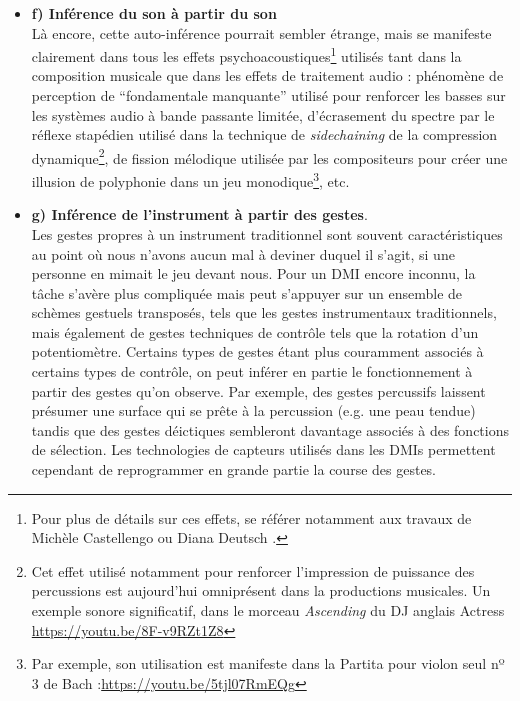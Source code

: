 \begin{itemize}[noitemsep]
	\item \textbf{f) Inférence du son à partir du son}\\
	Là encore, cette auto-inférence pourrait sembler étrange, mais se manifeste clairement dans tous les effets psychoacoustiques\footnote{Pour plus de détails sur ces effets, se référer notamment aux travaux de Michèle Castellengo \cite{castellengo_ecoute_2015} ou Diana Deutsch \cite{deutsch_psychology_2013}.} utilisés tant dans la composition musicale que dans les effets de traitement audio : phénomène de perception de ``fondamentale manquante'' utilisé pour renforcer les basses sur les systèmes audio à bande passante limitée, d'écrasement du spectre par le réflexe stapédien utilisé dans la technique de \textit{sidechaining} de la compression dynamique\footnote{\label{fn:gesture:sidechain} Cet effet utilisé notamment pour renforcer l'impression de puissance des percussions est aujourd'hui omniprésent dans la productions musicales. Un exemple sonore significatif, dans le morceau \textit{Ascending} du \gls{DJ} anglais Actress \url{https://youtu.be/8F-v9RZt1Z8}}, de fission mélodique utilisée par les compositeurs pour créer une illusion de polyphonie dans un jeu monodique\footnote{Par exemple, son utilisation est manifeste dans la Partita pour violon seul nº 3 de Bach :\url{https://youtu.be/5tjl07RmEQg}}, etc.

	\item \textbf{g) Inférence de l'instrument à partir des gestes}.\\
	Les gestes propres à un instrument traditionnel sont souvent caractéristiques au point où nous n'avons aucun mal à deviner duquel il s'agit, si une personne en mimait le jeu devant nous. Pour un \gls{DMI} encore inconnu, la tâche s'avère plus compliquée mais peut s'appuyer sur un ensemble de schèmes gestuels transposés, tels que les gestes instrumentaux traditionnels, mais également de gestes techniques de contrôle tels que la rotation d'un potentiomètre. Certains types de gestes étant plus couramment associés à certains types de contrôle, on peut inférer en partie le fonctionnement à partir des gestes qu'on observe. Par exemple, des gestes percussifs laissent présumer une surface qui se prête à la percussion (e.g. une peau tendue) tandis que des gestes déictiques sembleront davantage associés à des fonctions de sélection. Les technologies de capteurs utilisés dans les \glspl{DMI} permettent cependant de reprogrammer en grande partie la course des gestes.


\end{itemize}
